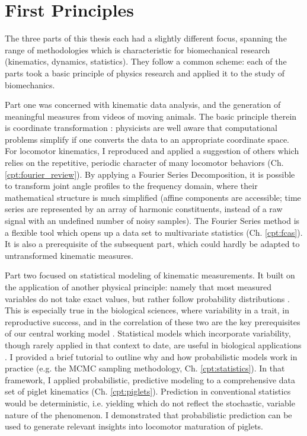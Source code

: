 \section{First Principles}
\label{sec:org85dd609}
The three parts of this thesis each had a slightly different focus, spanning the range of methodologies which is characteristic for biomechanical research (kinematics, dynamics, statistics).
They follow a common scheme:
each of the parts took a basic principle of physics research and applied it to the study of biomechanics.


Part one was concerned with kinematic data analysis, and the generation of meaningful measures from videos of moving animals.
The basic principle therein is coordinate transformation \citep{Tipler2007}: physicists are well aware that computational problems simplify if one converts the data to an appropriate coordinate space.
For locomotor kinematics, I reproduced and applied a suggestion of others \citep{Bernstein1927a,Webb2007} which relies on the repetitive, periodic character of many locomotor behaviors (Ch. \ref{cpt:fourier_review}).
By applying a Fourier Series Decomposition, it is possible to transform joint angle profiles to the frequency domain, where their mathematical structure is much simplified (affine components are accessible; time series are represented by an array of harmonic constituents, instead of a raw signal with an undefined number of noisy samples).
The Fourier Series method is a flexible tool which opens up a data set to multivariate statistics (Ch. \ref{cpt:fcas}).
It is also a prerequisite of the subsequent part, which could hardly be adapted to untransformed kinematic measures.

\medskip
Part two focused on statistical modeling of kinematic measurements.
It built on the application of another physical principle: namely that most measured variables do not take exact values, but rather follow probability distributions \citep{2022Probability}.
This is especially true in the biological sciences, where variability in a trait, in reproductive success, and in the correlation of these two are the key prerequisites of our central working model \citep{Darwin1859}.
Statistical models which incorporate variability, though rarely applied in that context to date, are useful in biological applications \citep{Roraas2019,DeGroote2021}.
I provided a brief tutorial to outline why and how probabilistic models work in practice (e.g. the MCMC sampling methodology, Ch. \ref{cpt:statistics}).
In that framework, I applied probabilistic, predictive modeling to a comprehensive data set of piglet kinematics (Ch. \ref{cpt:piglets}).
Prediction in conventional statistics would be deterministic, i.e. yielding  which do not reflect the stochastic, variable nature of the phenomenon.
I demonstrated that probabilistic prediction can be used to generate relevant insights into locomotor maturation of piglets.

